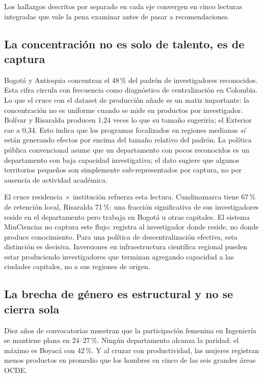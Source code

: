\documentclass[11pt,a4paper,oneside]{article}
\begin{document}
Los hallazgos descritos por separado en cada eje convergen en cinco lecturas integradas que vale la pena examinar antes de pasar a recomendaciones.

\subsection{La concentración no es solo de talento, es de captura}

Bogotá y Antioquia concentran el 48\,\% del padrón de investigadores reconocidos. Esta cifra circula con frecuencia como diagnóstico de centralización en Colombia. Lo que el cruce con el dataset de producción añade es un matiz importante: la concentración no es uniforme cuando se mide en productos por investigador. Bolívar y Risaralda producen 1{,}24 veces lo que su tamaño sugeriría; el Exterior cae a 0{,}34. Esto indica que los programas focalizados en regiones medianas \emph{sí} están generando efectos por encima del tamaño relativo del padrón. La política pública convencional asume que un departamento con pocos reconocidos es un departamento con baja capacidad investigativa; el dato sugiere que algunos territorios pequeños son simplemente sub-representados por captura, no por ausencia de actividad académica.

El cruce residencia × institución refuerza esta lectura. Cundinamarca tiene 67\,\% de retención local, Risaralda 71\,\%: una fracción significativa de sus investigadores reside en el departamento pero trabaja en Bogotá u otras capitales. El sistema MinCiencias no captura este flujo: registra al investigador donde reside, no donde produce conocimiento. Para una política de descentralización efectiva, esta distinción es decisiva. Inversiones en infraestructura científica regional pueden estar produciendo investigadores que terminan agregando capacidad a las ciudades capitales, no a sus regiones de origen.

\subsection{La brecha de género es estructural y no se cierra sola}

Diez años de convocatorias muestran que la participación femenina en Ingeniería se mantiene plana en 24--27\,\%. Ningún departamento alcanza la paridad: el máximo es Boyacá con 42\,\%. Y al cruzar con productividad, las mujeres registran menos productos en promedio que los hombres en cinco de las seis grandes áreas OCDE.
\end{document}
